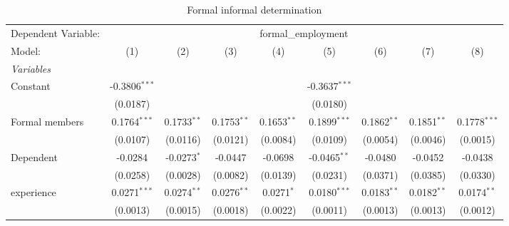 
\begin{table}[htbp]
   \caption{Formal informal determination}
   \centering
   \begin{tabular}{lcccccccc}
      \tabularnewline \midrule \midrule
      Dependent Variable: & \multicolumn{8}{c}{formal\_employment}\\
      Model:                    & (1)                    & (2)                     & (3)                     & (4)                     & (5)                     & (6)                     & (7)                     & (8)\\  
      \midrule
      \emph{Variables}\\
      Constant                  & -0.3806$^{***}$        &                         &                         &                         & -0.3637$^{***}$         &                         &                         &   \\   
                                & (0.0187)               &                         &                         &                         & (0.0180)                &                         &                         &   \\   
      Formal members            & 0.1764$^{***}$         & 0.1733$^{**}$           & 0.1753$^{**}$           & 0.1653$^{**}$           & 0.1899$^{***}$          & 0.1862$^{**}$           & 0.1851$^{**}$           & 0.1778$^{***}$\\   
                                & (0.0107)               & (0.0116)                & (0.0121)                & (0.0084)                & (0.0109)                & (0.0054)                & (0.0046)                & (0.0015)\\   
      Dependent                 & -0.0284                & -0.0273$^{*}$           & -0.0447                 & -0.0698                 & -0.0465$^{**}$          & -0.0480                 & -0.0452                 & -0.0438\\   
                                & (0.0258)               & (0.0028)                & (0.0082)                & (0.0139)                & (0.0231)                & (0.0371)                & (0.0385)                & (0.0330)\\   
      experience                & 0.0271$^{***}$         & 0.0274$^{**}$           & 0.0276$^{**}$           & 0.0271$^{*}$            & 0.0180$^{***}$          & 0.0183$^{**}$           & 0.0182$^{**}$           & 0.0174$^{**}$\\   
                                & (0.0013)               & (0.0015)                & (0.0018)                & (0.0022)                & (0.0011)                & (0.0013)                & (0.0013)                & (0.0012)\\   

\end{tabular}
\end{table}
